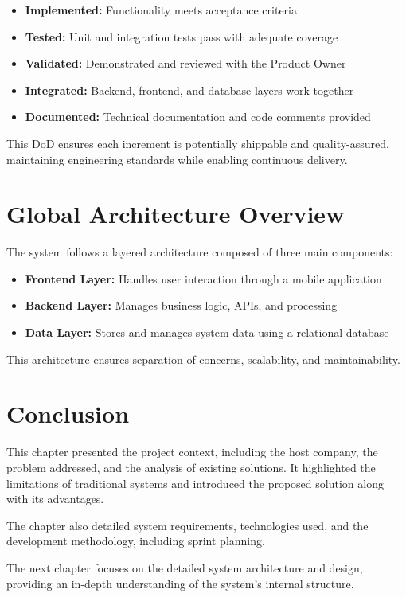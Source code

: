 \begin{itemize}
    \item \textbf{Implemented:} Functionality meets acceptance criteria
    \item \textbf{Tested:} Unit and integration tests pass with adequate coverage
    \item \textbf{Validated:} Demonstrated and reviewed with the Product Owner
    \item \textbf{Integrated:} Backend, frontend, and database layers work together
    \item \textbf{Documented:} Technical documentation and code comments provided
\end{itemize}

This DoD ensures each increment is potentially shippable and quality-assured, maintaining engineering standards while enabling continuous delivery.
\section{Global Architecture Overview}

The system follows a layered architecture composed of three main components:

\begin{itemize}
    \item \textbf{Frontend Layer:} Handles user interaction through a mobile application
    \item \textbf{Backend Layer:} Manages business logic, APIs, and processing
    \item \textbf{Data Layer:} Stores and manages system data using a relational database
\end{itemize}

This architecture ensures separation of concerns, scalability, and maintainability.

\section{Conclusion}

This chapter presented the project context, including the host company, the problem addressed, and the analysis of existing solutions. It highlighted the limitations of traditional systems and introduced the proposed solution along with its advantages.

The chapter also detailed system requirements, technologies used, and the development methodology, including sprint planning.

The next chapter focuses on the detailed system architecture and design, providing an in-depth understanding of the system’s internal structure.